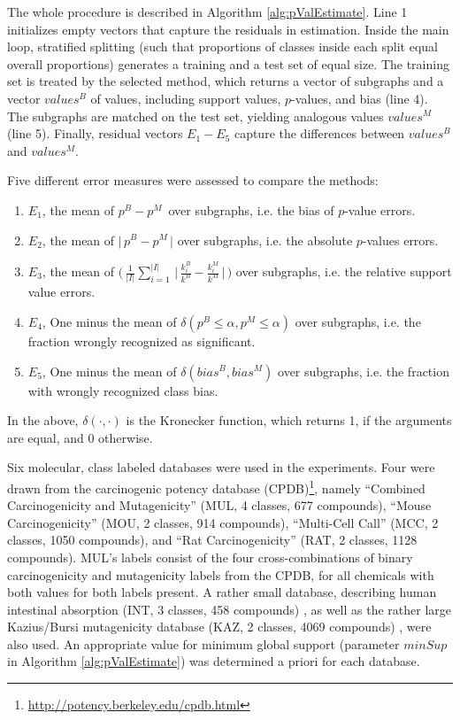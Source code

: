 \documentclass{sig-alternate}
\begin{document}
The whole procedure is described in Algorithm \ref{alg:pValEstimate}.
Line 1 initializes empty vectors that capture the residuals in estimation.
Inside the main loop, stratified splitting (such that proportions of classes
inside each split equal overall proportions) generates a training and a test
set of equal size. The training set is treated by the selected method, which
returns a vector of subgraphs and a vector $values^B$ of values,
including support values, $p$-values, and bias (line 4). The subgraphs are matched on
the test set, yielding analogous values $values^M$ (line 5). Finally, 
residual vectors $E_1-E_5$ capture the differences between $values^B$ and
$values^M$.

Five different
error measures were assessed to compare the methods:
\begin{enumerate}
  \item $E_1$, the mean of     $ p^B -p^M \,$                                                                                    over subgraphs, i.e. the bias of $p$-value errors.
  \item $E_2$, the mean of     $ \Big|\,p^B -p^M \,\Big|$                                                                        over subgraphs, i.e. the absolute $p$-values errors.
  \item $E_3$, the mean of     $ \Big(\,\frac{1}{|I|} \sum_{i=1}^{|I|} \,\Big|\,\frac{k^B_i}{k^B} - \frac{k^M_i}{k^M} \,\Big|\,\Big)$ over subgraphs, i.e. the relative support value errors.
  \item $E_4$, One minus the mean of $ \delta(p^B \le \alpha, p^M \le \alpha)$                                                         over subgraphs, i.e. the fraction wrongly recognized as significant.
  \item $E_5$, One minus the mean of $ \delta(bias^B, bias^M)$                                                                        over subgraphs, i.e. the fraction with wrongly recognized class bias.

\end{enumerate}
In the above, $\delta(\cdot,\cdot)$ is the Kronecker function, which returns 1, if the arguments are equal, and 0 otherwise.

Six molecular, class labeled databases were used in the experiments. 
Four were drawn from the carcinogenic potency database
(CPDB)\footnote{\url{http://potency.berkeley.edu/cpdb.html}}, namely 
``Combined Carcinogenicity and Mutagenicity'' (MUL, 4 classes, 677 compounds),
``Mouse Carcinogenicity'' (MOU, 2 classes, 914 compounds), 
``Multi-Cell Call'' (MCC, 2 classes, 1050 compounds), and 
``Rat Carcinogenicity'' (RAT, 2 classes, 1128 compounds). 
MUL's labels consist of the four cross-combinations of binary carcinogenicity
and mutagenicity labels from the CPDB, for all chemicals with both values for
both labels present.
A rather small database, describing human intestinal absorption (INT, 3 classes,
458 compounds) \cite{Suenderhauf10Combinatorial}, as well as the rather large
Kazius/Bursi mutagenicity database (KAZ, 2 classes, 4069 compounds)
\cite{kazius05derivation}, were also used. An appropriate value for minimum global
support (parameter $minSup$ in Algorithm \ref{alg:pValEstimate}) was determined a
priori for each database.
\end{document}
